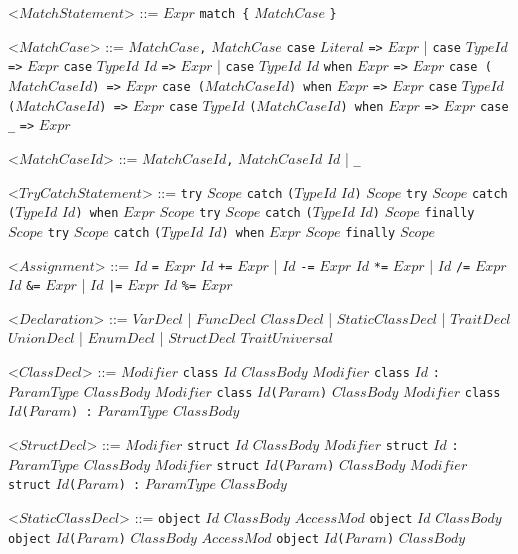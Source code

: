 \documentclass{article}
\newcommand{\gtext}[1]{<$#1$>}
\newcommand{\glit}[1]{\texttt{#1}}
\begin{document}
\begin{grammar}
	\newpage	
	
	\gtext{MatchStatement} ::= $Expr$ \glit{match \{} $MatchCase$ \glit{\}} 
	
	\gtext{MatchCase} ::= $MatchCase$\glit{,} $MatchCase$
	\alt \glit{case} $Literal$ \glit{=>} $Expr$ | \glit{case} $TypeId$ \glit{=>} $Expr$ 
	\alt \glit{case} $TypeId$ $Id$ \glit{=>} $Expr$ | \glit{case} $TypeId$ $Id$ \glit{when} $Expr$ \glit{=>} $Expr$ 
	\alt \glit{case (}$MatchCaseId$\glit{) =>} $Expr$
	\alt \glit{case (}$MatchCaseId$\glit{) when} $Expr$ \glit{=>} $Expr$ 
	\alt \glit{case} $TypeId$ \glit{(}$MatchCaseId$\glit{) =>} $Expr$
	\alt \glit{case} $TypeId$ \glit{(}$MatchCaseId$\glit{) when} $Expr$ \glit{=>} $Expr$ 
	\alt \glit{case} \glit{_} \glit{=>} $Expr$
	
	\gtext{MatchCaseId} ::= $MatchCaseId$\glit{,} $MatchCaseId$
	\alt $Id$ | \glit{_}

	\gtext{TryCatchStatement} ::= \glit{try} $Scope$ \glit{catch} \glit{(}$TypeId$ $Id$\glit{)} $Scope$
	\alt \glit{try} $Scope$ \glit{catch} \glit{(}$TypeId$ $Id$\glit{) when} $Expr$ $Scope$  
	\alt \glit{try} $Scope$ \glit{catch} \glit{(}$TypeId$ $Id$\glit{)} $Scope$ \glit{finally} $Scope$
	\alt \glit{try} $Scope$ \glit{catch} \glit{(}$TypeId$ $Id$\glit{) when} $Expr$ $Scope$ \glit{finally} $Scope$

	\gtext{Assignment} ::= $Id$ \glit{=} $Expr$
	\alt $Id$ \glit{+=} $Expr$ | $Id$ \glit{-=} $Expr$
	\alt $Id$ \glit{*=} $Expr$ | $Id$ \glit{/=} $Expr$
	\alt $Id$ \glit{\&=} $Expr$ | $Id$ \glit{|=} $Expr$
	\alt $Id$ \glit{\%=} $Expr$
	
	\gtext{Declaration} ::=  $VarDecl$ | $FuncDecl$ %
	\alt $ClassDecl$ | $StaticClassDecl$ |  $TraitDecl$ %
	\alt $UnionDecl$ | $EnumDecl$ | $StructDecl$ %
	\alt $TraitUniversal$ %
	
	\gtext{ClassDecl} ::= $Modifier$ \glit{class} $Id$ $ClassBody$
	\alt $Modifier$ \glit{class} $Id$ \glit{:} $ParamType$ $ClassBody$
	\alt $Modifier$ \glit{class} $Id$\glit{(}$Param$\glit{)} $ClassBody$
	\alt $Modifier$ \glit{class} $Id$\glit{(}$Param$\glit{) :} $ParamType$ $ClassBody$
	
	\gtext{StructDecl} ::= $Modifier$ \glit{struct} $Id$ $ClassBody$
	\alt $Modifier$ \glit{struct} $Id$ \glit{:} $ParamType$ $ClassBody$
	\alt $Modifier$ \glit{struct} $Id$\glit{(}$Param$\glit{)} $ClassBody$
	\alt $Modifier$ \glit{struct} $Id$\glit{(}$Param$\glit{) :} $ParamType$ $ClassBody$
	
	\gtext{StaticClassDecl} ::= \glit{object} $Id$ $ClassBody$
	\alt $AccessMod$ \glit{object} $Id$ $ClassBody$
	\alt \glit{object} $Id$\glit{(}$Param$\glit{)} $ClassBody$
	\alt $AccessMod$ \glit{object} $Id$\glit{(}$Param$\glit{)} $ClassBody$
	

\end{grammar}
\end{document}
